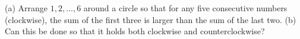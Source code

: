 (a) Arrange $1,2,\dots,6$ around a circle so that for any five consecutive numbers (clockwise), the sum of the first three is larger than the sum of the last two.
(b) Can this be done so that it holds both clockwise and counterclockwise?
